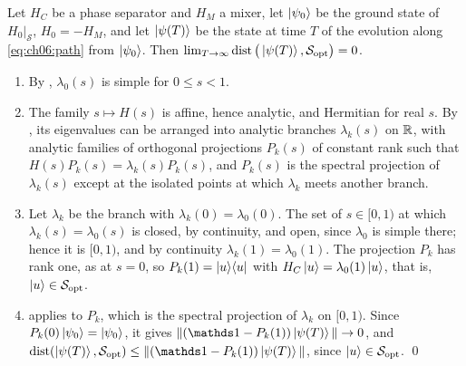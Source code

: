 \documentclass[handoutsbeamer.tex]{subfiles}
\begin{document}
\begin{frame}
\onp{\scriptsize}
\begin{thm}\label{thm:ch06:qaa}
Let $H_C$ be a phase separator and $H_M$ a mixer, let $\ket{\psi_0}$ be the ground state of $H_0|_{\mathcal S}$, $H_0 = -H_M$, and let $\ket{\psi(T)}$ be the state at time $T$ of the evolution along \eqref{eq:ch06:path} from $\ket{\psi_0}$. Then $\lim_{T\to\infty}\operatorname{dist}\big(\ket{\psi(T)},\mathcal S_{\rm opt}\big) = 0$.
\end{thm}
\begin{enumerate}\setlength\itemsep{0.1em}
    \item By , $\lambda_0(s)$ is simple for $0\le s<1$.
    \item The family $s\mapsto H(s)$ is affine, hence analytic, and Hermitian for real $s$. By , its eigenvalues can be arranged into analytic branches $\lambda_k(s)$ on $\mathbb{R}$, with analytic families of orthogonal projections $P_k(s)$ of constant rank such that $H(s)P_k(s) = \lambda_k(s)P_k(s)$, and $P_k(s)$ is the spectral projection of $\lambda_k(s)$ except at the isolated points at which $\lambda_k$ meets another branch.
    \item Let $\lambda_k$ be the branch with $\lambda_k(0) = \lambda_0(0)$. The set of $s\in[0,1)$ at which $\lambda_k(s) = \lambda_0(s)$ is closed, by continuity, and open, since $\lambda_0$ is simple there; hence it is $[0,1)$, and by continuity $\lambda_k(1) = \lambda_0(1)$. The projection $P_k$ has rank one, as at $s = 0$, so $P_k(1) = \ket u\!\bra u$ with $H_C\ket u = \lambda_0(1)\ket u$, that is, $\ket u\in\mathcal S_{\rm opt}$.
    \item {} applies to $P_k$, which is the spectral projection of $\lambda_k$ on $[0,1)$. Since $P_k(0)\ket{\psi_0} = \ket{\psi_0}$, it gives $\|(\one - P_k(1))\ket{\psi(T)}\|\to0$, and $\dist(\ket{\psi(T)},\mathcal S_{\rm opt})\le\|(\one - P_k(1))\ket{\psi(T)}\|$, since $\ket u\in\mathcal S_{\rm opt}$. \qed
\end{enumerate}
\end{frame}
\end{document}
